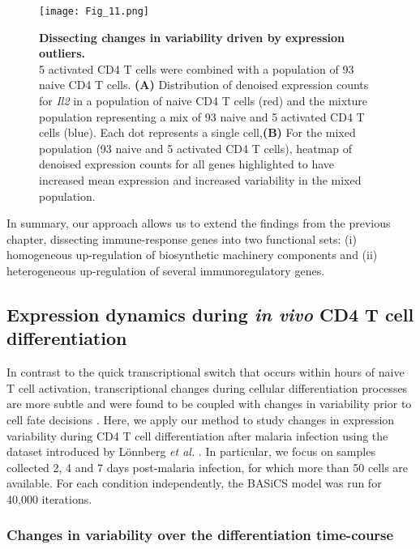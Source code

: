 \begin{figure}[!h]
\centering
\texttt{[image: Fig\_11.png]}
\caption[Dissecting changes in variability driven by expression outliers]{\textbf{Dissecting changes in variability driven by expression outliers.}\\
5 activated CD4\plus{} T cells were combined with a population of 93 naive CD4\plus{} T cells. \textbf{(A)} Distribution of denoised expression counts for \textit{Il2} in a population of naive CD4\plus{} T cells (red) and the mixture population representing a mix of 93 naive and 5 activated CD4\plus{} T cells (blue). Each dot represents a single cell,\textbf{(B)} For the mixed population (93 naive and 5 activated CD4\plus{} T cells), heatmap of denoised expression counts for all genes highlighted to have increased mean expression and increased variability in the mixed population.}
\label{fig2:mixture_population}
\end{figure}

In summary, our approach allows us to extend the findings from the previous chapter, dissecting immune-response genes into two functional sets: (i) homogeneous up-regulation of biosynthetic machinery components and (ii) heterogeneous up-regulation of several immunoregulatory genes.

\newpage

\subsection{Expression dynamics during \textit{in vivo} CD4\plus{} T cell differentiation}

In contrast to the quick transcriptional switch that occurs within hours of naive T cell activation, transcriptional changes during cellular differentiation processes are more subtle and were found to be coupled with changes in variability prior to cell fate decisions \citep{Richard2016, Mojtahedi2016}. Here, we apply our method to study changes in expression variability during CD4\plus{} T cell differentiation after malaria infection using the dataset introduced by L\"onnberg \emph{et al.} \cite{Lonnberg2017}. In particular, we focus on samples collected 2, 4 and 7 days post-malaria infection, for which more than 50 cells are available. For each condition independently, the BASiCS model was run for 40,000 iterations.\\

\subsubsection{Changes in variability over the differentiation time-course}

